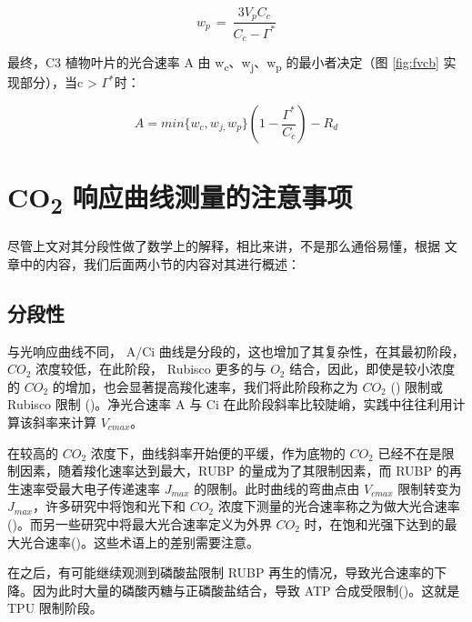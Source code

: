 \documentclass[
]{krantz}
\begin{document}
\begin{equation}
w_{p\ }=\ \frac{3V_{p}C_{c}}{C_{c}-\Gamma^{*}}
\label{eq:wp}
\end{equation}

最终，C3 植物叶片的光合速率 A 由 w\textsubscript{c}、w\textsubscript{j}、w\textsubscript{p}
的最小者决定（图 \ref{fig:fvcb} 实现部分），当c \textgreater{} \(\Gamma^{*}\)时：

\begin{equation}
A=min\{w_{c},w_{j,}w_{p}\}(1-\frac{\Gamma^{*}}{C_{c}})-R_{d}
\label{eq:fvcbfin}
\end{equation}

\hypertarget{co2_note}{%
\section{\texorpdfstring{CO\textsubscript{2} 响应曲线测量的注意事项}{CO2 响应曲线测量的注意事项}}\label{co2_note}}

尽管上文对其分段性做了数学上的解释，相比来讲，不是那么通俗易懂，根据 \citet{matthew2018} 文章中的内容，我们后面两小节的内容对其进行概述：

\hypertarget{model_3}{%
\subsection{分段性}\label{model_3}}

与光响应曲线不同， A/Ci 曲线是分段的，这也增加了其复杂性，在其最初阶段，\(CO_2\) 浓度较低，在此阶段， Rubisco 更多的与 \(O_2\) 结合，因此，即使是较小浓度的 \(CO_2\) 的增加，也会显著提高羧化速率，我们将此阶段称之为 \(CO_2\) (\citet{Wullschleger1993Biochemical}) 限制或 Rubisco 限制 (\citet{Long2003Gas})。净光合速率 A 与 Ci 在此阶段斜率比较陡峭，实践中往往利用计算该斜率来计算 \(V_{cmax}\)。

在较高的 \(CO_2\) 浓度下，曲线斜率开始便的平缓，作为底物的 \(CO_2\) 已经不在是限制因素，随着羧化速率达到最大，RUBP 的量成为了其限制因素，而 RUBP 的再生速率受最大电子传递速率 \(J_{max}\) 的限制。此时曲线的弯曲点由 \(V_{cmax}\) 限制转变为 \(J_{max}\)，许多研究中将饱和光下和 \(CO_2\) 浓度下测量的光合速率称之为做大光合速率(\citet{heath2005rising})。而另一些研究中将最大光合速率定义为外界 \(CO_2\) 时，在饱和光强下达到的最大光合速率(\citet{marshall1980a})。这些术语上的差别需要注意。

在之后，有可能继续观测到磷酸盐限制 RUBP 再生的情况，导致光合速率的下降。因为此时大量的磷酸丙糖与正磷酸盐结合，导致 ATP 合成受限制(\citet{ellsworth2015phosphorus})。这就是 TPU 限制阶段。
\end{document}
